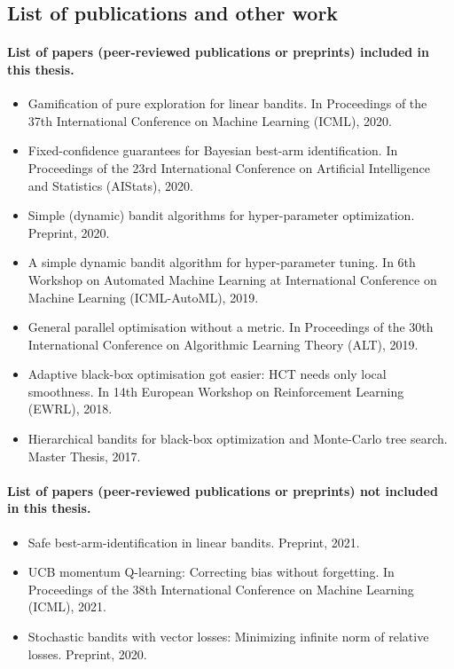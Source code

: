 \subsection{List of publications and other work}\label{sec:intro.contributions.list}

\paragraph{List of papers (peer-reviewed publications or preprints) included in this thesis.}

\begin{itemize}[label=]
    \item Gamification of pure exploration for linear bandits. In Proceedings of the 37th International Conference on Machine Learning (ICML), 2020.~\citep{degenne2020game}
    \item Fixed-confidence guarantees for Bayesian best-arm identification. In Proceedings of the 23rd International Conference on Artificial Intelligence and Statistics (AIStats), 2020.\citep{shang2020t3c}
    \item Simple (dynamic) bandit algorithms for hyper-parameter optimization. Preprint, 2020.~\citep{shang2020dttts}
    \item A simple dynamic bandit algorithm for hyper-parameter tuning. In 6th Workshop on Automated Machine Learning at International Conference on Machine Learning (ICML-AutoML), 2019.~\citep{shang2019dttts}
    \item General parallel optimisation without a metric. In Proceedings of the 30th International Conference on Algorithmic Learning Theory (ALT), 2019.~\citep{shang2019adaptive}
    \item Adaptive black-box optimisation got easier: HCT needs only local smoothness. In 14th European Workshop on Reinforcement Learning (EWRL), 2018.~\citep{shang2018adaptive}
    \item Hierarchical bandits for black-box optimization and Monte-Carlo tree search. Master Thesis, 2017.~\citep{shang2017master}
\end{itemize}

\paragraph{List of papers (peer-reviewed publications or preprints) not included in this thesis.}

\begin{itemize}[label=]
    \item Safe best-arm-identification in linear bandits. Preprint, 2021.~\citep{shang2021safe}
    \item UCB momentum Q-learning: Correcting bias without forgetting. In Proceedings of the 38th International Conference on Machine Learning (ICML), 2021.~\citep{menard2021ucbmq}
    \item Stochastic bandits with vector losses: Minimizing infinite norm of relative losses. Preprint, 2020.~\citep{shang2020vector}
\end{itemize}

